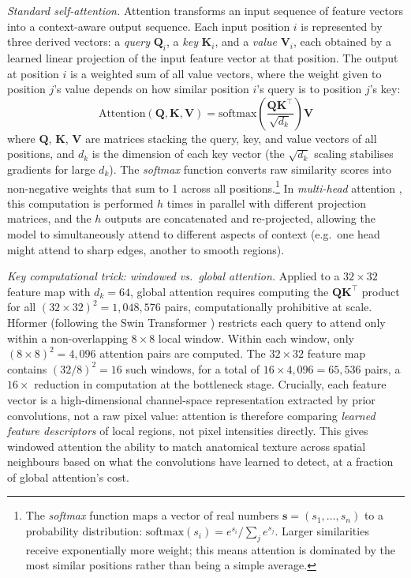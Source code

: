 \documentclass[12pt, a4paper, twoside, openright]{book}
\begin{document}
\textit{Standard self-attention.} Attention \cite{vaswani_attention_2017} transforms an input sequence of feature vectors into a context-aware output sequence. Each input position $i$ is represented by three derived vectors: a \emph{query} $\mathbf{Q}_i$, a \emph{key} $\mathbf{K}_i$, and a \emph{value} $\mathbf{V}_i$, each obtained by a learned linear projection of the input feature vector at that position. The output at position $i$ is a weighted sum of all value vectors, where the weight given to position $j$'s value depends on how similar position $i$'s query is to position $j$'s key:
\begin{equation}
\label{eq:methods:attention}
\mathrm{Attention}(\mathbf{Q},\mathbf{K},\mathbf{V}) = \mathrm{softmax}\!\left(\frac{\mathbf{Q}\mathbf{K}^\top}{\sqrt{d_k}}\right)\mathbf{V}
\end{equation}
where $\mathbf{Q}$, $\mathbf{K}$, $\mathbf{V}$ are matrices stacking the query, key, and value vectors of all positions, and $d_k$ is the dimension of each key vector (the $\sqrt{d_k}$ scaling stabilises gradients for large $d_k$). The \emph{softmax} function converts raw similarity scores into non-negative weights that sum to 1 across all positions.\footnote{The \emph{softmax} function maps a vector of real numbers $\mathbf{s} = (s_1, \ldots, s_n)$ to a probability distribution: $\mathrm{softmax}(s_i) = e^{s_i} / \sum_j e^{s_j}$. Larger similarities receive exponentially more weight; this means attention is dominated by the most similar positions rather than being a simple average.} In \emph{multi-head} attention \cite{vaswani_attention_2017}, this computation is performed $h$ times in parallel with different projection matrices, and the $h$ outputs are concatenated and re-projected, allowing the model to simultaneously attend to different aspects of context (e.g.\ one head might attend to sharp edges, another to smooth regions).

\textit{Key computational trick: windowed vs.\ global attention.} Applied to a $32\times32$ feature map with $d_k = 64$, global attention requires computing the $\mathbf{Q}\mathbf{K}^\top$ product for all $(32\times32)^2 = 1{,}048{,}576$ pairs, computationally prohibitive at scale. Hformer (following the Swin Transformer \cite{liu_swin_2021}) restricts each query to attend only within a non-overlapping $8\times8$ local window. Within each window, only $(8\times8)^2 = 4{,}096$ attention pairs are computed. The $32\times32$ feature map contains $(32/8)^2 = 16$ such windows, for a total of $16 \times 4{,}096 = 65{,}536$ pairs, a $16\times$ reduction in computation at the bottleneck stage. Crucially, each feature vector is a high-dimensional channel-space representation extracted by prior convolutions, not a raw pixel value: attention is therefore comparing \emph{learned feature descriptors} of local regions, not pixel intensities directly. This gives windowed attention the ability to match anatomical texture across spatial neighbours based on what the convolutions have learned to detect, at a fraction of global attention's cost.
\end{document}
